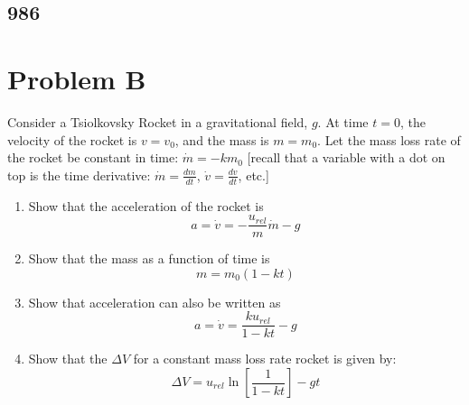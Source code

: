 \documentclass{article}
\begin{document}
\subsection{986}

\section{Problem B}

Consider a Tsiolkovsky Rocket in a gravitational field, $ g $. At time $ t = 0 $, the velocity of the rocket is $ v = v_0 $, and the mass is $ m = m_0 $. Let the mass loss rate of the rocket be constant in time: $ \dot{m} = -km_0 $ [recall that a variable with a dot on top is the time derivative: $ \dot{m} = \frac{dm}{dt} $, $ \dot{v} = \frac{dv}{dt} $, etc.]
\begin{enumerate}[label = \textbf{\arabic*.}]
	\item Show that the acceleration of the rocket is
		\begin{equation*}
			a = \dot{v} = -\frac{u_{rel}}{m}\dot{m} - g
		\end{equation*}
	\item Show that the mass as a function of time is
		\begin{equation*}
			m = m_0(1 - kt)
		\end{equation*}
	\item Show that acceleration can also be written as
		\begin{equation*}
			a = \dot{v} = \frac{ku_{rel}}{1 - kt} - g
		\end{equation*}
	\item Show that the $ \Delta V $ for a constant mass loss rate rocket is given by:
		\begin{equation*}
			\Delta V = u_{rel}\ln \left[ \frac{1}{1 - kt} \right] - gt
		\end{equation*}
\end{enumerate}
\end{document}
